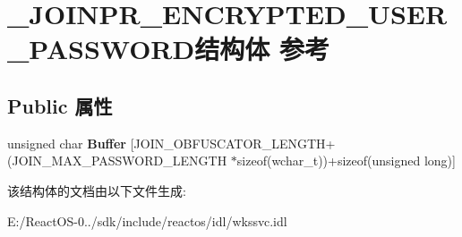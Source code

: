 \hypertarget{struct___j_o_i_n_p_r___e_n_c_r_y_p_t_e_d___u_s_e_r___p_a_s_s_w_o_r_d}{}\section{\+\_\+\+J\+O\+I\+N\+P\+R\+\_\+\+E\+N\+C\+R\+Y\+P\+T\+E\+D\+\_\+\+U\+S\+E\+R\+\_\+\+P\+A\+S\+S\+W\+O\+R\+D结构体 参考}
\label{struct___j_o_i_n_p_r___e_n_c_r_y_p_t_e_d___u_s_e_r___p_a_s_s_w_o_r_d}
\subsection*{Public 属性}
\begin{DoxyCompactItemize}
\item 
\mbox{\label{struct___j_o_i_n_p_r___e_n_c_r_y_p_t_e_d___u_s_e_r___p_a_s_s_w_o_r_d_ad6521a2c18cea46635a8d62726817c80}} 
unsigned char {\bfseries Buffer} \mbox{[}J\+O\+I\+N\+\_\+\+O\+B\+F\+U\+S\+C\+A\+T\+O\+R\+\_\+\+L\+E\+N\+G\+TH+(J\+O\+I\+N\+\_\+\+M\+A\+X\+\_\+\+P\+A\+S\+S\+W\+O\+R\+D\+\_\+\+L\+E\+N\+G\+TH $\ast$sizeof(wchar\+\_\+t))+sizeof(unsigned long)\mbox{]}
\end{DoxyCompactItemize}


该结构体的文档由以下文件生成\+:\begin{DoxyCompactItemize}
\item 
E\+:/\+React\+O\+S-\/0../sdk/include/reactos/idl/wkssvc.\+idl\end{DoxyCompactItemize}
